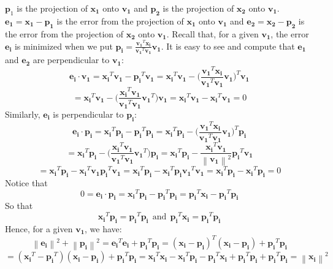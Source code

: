 \documentclass{tufte-handout}
\newcommand{\norm}[1]{\left\lVert#1\right\rVert}
\begin{document}
\noindent$\mathbf{p}_1$ is the projection of $\mathbf{x_1}$ onto $\mathbf{v_1}$ and $\mathbf{p_2}$ is the projection of $\mathbf{x_2}$ onto $\mathbf{v_1}$. $\mathbf{e_1}=\mathbf{x_1}-\mathbf{p_1}$ is the error from the projection of $\mathbf{x_1}$ onto $\mathbf{v_1}$ and $\mathbf{e_2}=\mathbf{x_2}-\mathbf{p_2}$ is the error from the projection of $\mathbf{x_2}$ onto $\mathbf{v_1}$. Recall that, for a given $\mathbf{v_1}$, the error $\mathbf{e_i}$ is minimized when we put $\mathbf{p_i} =\frac{\mathbf{v_1}^T\mathbf{x_i}} {\mathbf{v_1}^T\mathbf{v_1}}\mathbf{v_1}$. It is easy to see and compute that $\mathbf{e_1}$ and $\mathbf{e_2}$ are perpendicular to $\mathbf{v_1}$:
\[
\mathbf{e_i}\cdot\mathbf{v_1}
=
\mathbf{x_i}^T\mathbf{v_1}-\mathbf{p_i}^T\mathbf{v_1}
=
\mathbf{x_i}^T\mathbf{v_1}
-
\Big(\frac{\mathbf{v_1}^T\mathbf{x_i}}{\mathbf{v_1}^T\mathbf{v_1}}\mathbf{v_1}\Big)^T \mathbf{v_1}
\]
\[
=
\mathbf{x_i}^T\mathbf{v_1}
-
\Big(\frac{\mathbf{x_i}^T\mathbf{v_1}}{\mathbf{v_1}^T\mathbf{v_1}}\mathbf{v_1}^T\Big) \mathbf{v_1}
=\mathbf{x_i}^T\mathbf{v_1}-\mathbf{x_i}^T\mathbf{v_1}=0
\]
Similarly, $\mathbf{e_i}$ is perpendicular to $\mathbf{p_i}$:
\[
\mathbf{e_i}\cdot\mathbf{p_i}
=
\mathbf{x_i}^T\mathbf{p_i}-\mathbf{p_i}^T\mathbf{p_i}
=
\mathbf{x_i}^T\mathbf{p_i}
-
\Big(\frac{\mathbf{v_1}^T\mathbf{x_i}}{\mathbf{v_1}^T\mathbf{v_1}}\mathbf{v_1}\Big)^T \mathbf{p_i}
\]
\[
=
\mathbf{x_i}^T\mathbf{p_i}
-
\Big(\frac{\mathbf{x_i}^T\mathbf{v_1}}{\mathbf{v_1}^T\mathbf{v_1}}\mathbf{v_1}^T\Big) \mathbf{p_i}
=
\mathbf{x_i}^T\mathbf{p_i}
-
\frac{\mathbf{x_i}^T\mathbf{v_1}}{\norm{\mathbf{v_1}}^2}\mathbf{p_i}^T \mathbf{v_1}
\]
\[
=
\mathbf{x_i}^T\mathbf{p_i}
-
\mathbf{x_i}^T\mathbf{v_1}\mathbf{p_i}^T \mathbf{v_1}
=
\mathbf{x_i}^T\mathbf{p_i}
-
\mathbf{x_i}^T\mathbf{p_i}\mathbf{v_1}^T \mathbf{v_1}
=
\mathbf{x_i}^T\mathbf{p_i}
-
\mathbf{x_i}^T\mathbf{p_i}
=0
\]
Notice that
\[
0=
\mathbf{e_i}\cdot\mathbf{p_i}
=
\mathbf{x_i}^T\mathbf{p_i}-\mathbf{p_i}^T\mathbf{p_i}
=
\mathbf{p_i}^T\mathbf{x_i}-\mathbf{p_i}^T\mathbf{p_i}
\]
So that
\[
\mathbf{x_i}^T\mathbf{p_i}
=
\mathbf{p_i}^T\mathbf{p_i}
~~\text{and}~~
\mathbf{p_i}^T\mathbf{x_i}
=
\mathbf{p_i}^T\mathbf{p_i}
\]
Hence, for a given $\mathbf{v_1}$, we have:
\[
\norm{\mathbf{e_i}}^2+\norm{\mathbf{p_i}}^2
=
\mathbf{e_i}^T\mathbf{e_i}+\mathbf{p_i}^T\mathbf{p_i}
=
(\mathbf{x_i}-\mathbf{p_i})^T(\mathbf{x_i}-\mathbf{p_i})+\mathbf{p_i}^T\mathbf{p_i}
\]
\[
=
(\mathbf{x_i}^T-\mathbf{p_i}^T)(\mathbf{x_i}-\mathbf{p_i})+\mathbf{p_i}^T\mathbf{p_i}
=\mathbf{x_i}^T\mathbf{x_i}-\mathbf{x_i}^T\mathbf{p_i}-\mathbf{p_i}^T\mathbf{x_i} +\mathbf{p_i}^T\mathbf{p_i}+\mathbf{p_i}^T\mathbf{p_i}
=\norm{\mathbf{x_i}}^2
\]
\end{document}
